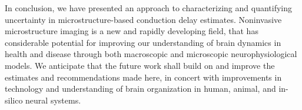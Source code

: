 In conclusion, we have presented an approach to characterizing and quantifying uncertainty in microstructure-based conduction delay estimates. Noninvasive microstructure imaging is a new and rapidly developing field, that has considerable potential for improving our understanding of brain dynamics in health and disease through both macroscopic and microscopic neurophysiological models. We anticipate that the future work shall build on and improve the estimates and recommendations made here, in concert with improvements in technology and understanding of brain organization in human, animal, and in-silico neural systems. 














